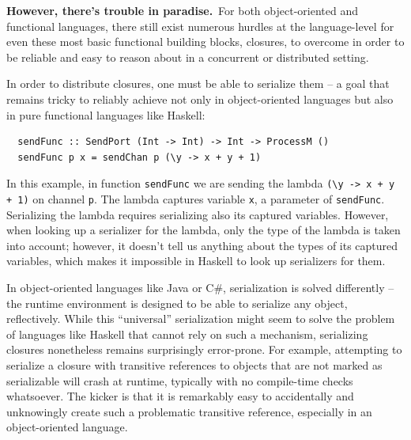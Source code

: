 \documentclass[runningheads]{llncs}
\begin{document}
\begin{sloppypar}



{\bf However, there's trouble in paradise.}~For both object-oriented and
functional languages, there still exist numerous hurdles at the language-level
for even these most basic functional building blocks, closures, to overcome in
order to be reliable and easy to reason about in a concurrent or distributed
setting.

In order to distribute closures, one must be able to serialize them -- a goal
that remains tricky to reliably achieve not only in object-oriented
languages but also in pure functional languages like Haskell:

\begin{lstlisting}
  sendFunc :: SendPort (Int -> Int) -> Int -> ProcessM ()
  sendFunc p x = sendChan p (\y -> x + y + 1)
\end{lstlisting}
\noindent
In this example, in function \verb|sendFunc| we are sending the lambda \verb|(\y -> x + y + 1)| on channel \verb|p|. The lambda captures variable \verb|x|, a parameter of \verb|sendFunc|. Serializing the lambda requires serializing also its captured variables. However, when looking up a serializer for the lambda, only the type of the lambda is taken into account; however, it doesn't tell us anything about the types of its captured variables, which makes it impossible in Haskell to look up serializers for them.

In object-oriented languages like Java or C\#, serialization is solved
differently -- the runtime environment is designed to be able to serialize any
object, reflectively. While this ``universal'' serialization might seem to
solve the problem of languages like Haskell that cannot rely on such a
mechanism, serializing closures nonetheless remains surprisingly error-prone.
For example, attempting to serialize a closure with transitive references to
objects that are not marked as serializable will crash at runtime, typically
with no compile-time checks whatsoever. The kicker is that it is remarkably
easy to accidentally and unknowingly create such a problematic transitive reference,
especially in an object-oriented language.


\end{sloppypar}
\end{document}
